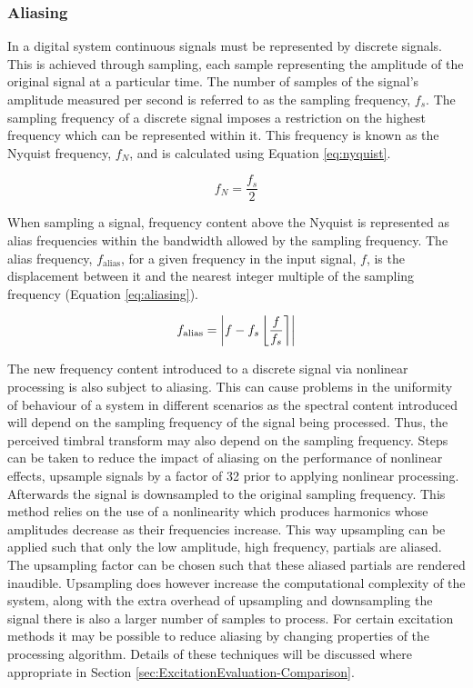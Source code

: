 		\subsubsection*{Aliasing}
			In a digital system continuous signals must be represented by discrete signals. This is achieved
			through sampling, each sample representing the amplitude of the original signal at a particular
			time. The number of samples of the signal's amplitude measured per second is referred to as the
			sampling frequency, $f_{s}$. The sampling frequency of a discrete signal imposes a restriction on
			the highest frequency which can be represented within it. This frequency is known as the Nyquist
			frequency, $f_{N}$, and is calculated using Equation \ref{eq:nyquist}.

			\begin{equation}
				f_{N} = \frac{f_{s}}{2}
				\label{eq:nyquist}
			\end{equation}

			When sampling a signal, frequency content above the Nyquist is represented as alias frequencies
			within the bandwidth allowed by the sampling frequency. The alias frequency, $f_{\mathrm{alias}}$,
			for a given frequency in the input signal, $f$, is the displacement between it and the nearest
			integer multiple of the sampling frequency (Equation \ref{eq:aliasing}).

			\begin{equation}
				f_{\mathrm{alias}} = \left|f - f_{s}\left\lfloor\frac{f}{f_{s}}\right\rceil\right|
				\label{eq:aliasing}
			\end{equation}

			The new frequency content introduced to a discrete signal via nonlinear processing is also subject
			to aliasing. This can cause problems in the uniformity of behaviour of a system in different
			scenarios as the spectral content introduced will depend on the sampling frequency of the signal
			being processed. Thus, the perceived timbral transform may also depend on the sampling frequency.
			Steps can be taken to reduce the impact of aliasing on the performance of nonlinear effects,
			\citep{vetter2013estimation} upsample signals by a factor of 32 prior to applying nonlinear
			processing. Afterwards the signal is downsampled to the original sampling frequency. This method
			relies on the use of a nonlinearity which produces harmonics whose amplitudes decrease as their
			frequencies increase. This way upsampling can be applied such that only the low amplitude, high
			frequency, partials are aliased. The upsampling factor can be chosen such that these aliased
			partials are rendered inaudible. Upsampling does however increase the computational complexity of
			the system, along with the extra overhead of upsampling and downsampling the signal there is also a
			larger number of samples to process. For certain excitation methods it may be possible to reduce
			aliasing by changing properties of the processing algorithm. Details of these techniques will be
			discussed where appropriate in Section \ref{sec:ExcitationEvaluation-Comparison}.

